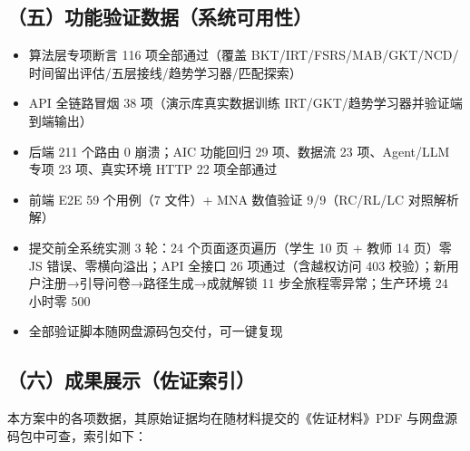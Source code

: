 \documentclass[zihao=-4,a4paper,UTF8,fontset=windows]{ctexart}
\begin{document}
\subsection{（五）功能验证数据（系统可用性）}
\begin{itemize}[leftmargin=2em,itemsep=0pt,topsep=0pt]
\item 算法层专项断言 116 项全部通过（覆盖 BKT/IRT/FSRS/MAB/GKT/NCD/时间留出评估/五层接线/趋势学习器/匹配探索）
\end{itemize}
\begin{itemize}[leftmargin=2em,itemsep=0pt,topsep=0pt]
\item API 全链路冒烟 38 项（演示库真实数据训练 IRT/GKT/趋势学习器并验证端到端输出）
\end{itemize}
\begin{itemize}[leftmargin=2em,itemsep=0pt,topsep=0pt]
\item 后端 211 个路由 0 崩溃；AIC 功能回归 29 项、数据流 23 项、Agent/LLM 专项 23 项、真实环境 HTTP 22 项全部通过
\end{itemize}
\begin{itemize}[leftmargin=2em,itemsep=0pt,topsep=0pt]
\item 前端 E2E 59 个用例（7 文件）+ MNA 数值验证 9/9（RC/RL/LC 对照解析解）
\end{itemize}
\begin{itemize}[leftmargin=2em,itemsep=0pt,topsep=0pt]
\item 提交前全系统实测 3 轮：24 个页面逐页遍历（学生 10 页 + 教师 14 页）零 JS 错误、零横向溢出；API 全接口 26 项通过（含越权访问 403 校验）；新用户注册→引导问卷→路径生成→成就解锁 11 步全旅程零异常；生产环境 24 小时零 500
\end{itemize}
\begin{itemize}[leftmargin=2em,itemsep=0pt,topsep=0pt]
\item 全部验证脚本随网盘源码包交付，可一键复现
\end{itemize}
\subsection{（六）成果展示（佐证索引）}

本方案中的各项数据，其原始证据均在随材料提交的《佐证材料》PDF 与网盘源码包中可查，索引如下：
\end{document}
